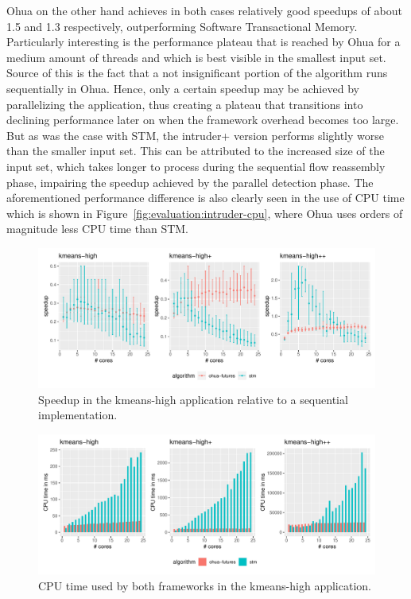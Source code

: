 Ohua on the other hand achieves in both cases relatively good speedups of about 1.5 and 1.3 respectively, outperforming Software Transactional Memory.
Particularly interesting is the performance plateau that is reached by Ohua for a medium amount of threads and which is best visible in the smallest input set.
Source of this is the fact that a not insignificant portion of the algorithm runs sequentially in Ohua.
Hence, only a certain speedup may be achieved by parallelizing the application, thus creating a plateau that transitions into declining performance later on when the framework overhead becomes too large.
But as was the case with STM, the intruder+ version performs slightly worse than the smaller input set.
This can be attributed to the increased size of the input set, which takes longer to process during the sequential flow reassembly phase, impairing the speedup achieved by the parallel detection phase.
The aforementioned performance difference is also clearly seen in the use of CPU time which is shown in Figure~\ref{fig:evaluation:intruder-cpu}, where Ohua uses orders of magnitude less CPU time than STM.


\begin{figure}
    \centering
    \includegraphics[width=\textwidth,keepaspectratio]{gfx/results/kmeans-high_comb}
    \caption{Speedup in the kmeans-high application relative to a sequential implementation.}%
    \label{fig:evaluation:kmeans-high}
\end{figure}

\begin{figure}
    \centering
    \includegraphics[width=\textwidth,keepaspectratio]{gfx/results/cpu_kmeans-high_comb}
    \caption{CPU time used by both frameworks in the kmeans-high application.}%
    \label{fig:evaluation:kmeans-high-cpu}
\end{figure}

